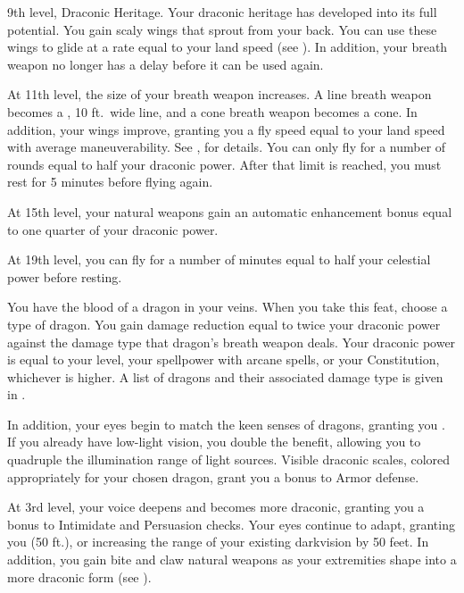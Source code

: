     \featpres 9th level, Draconic Heritage.
    \featben Your draconic heritage has developed into its full potential.
    You gain scaly wings that sprout from your back.
    You can use these wings to glide at a rate equal to your land speed (see ).
    In addition, your breath weapon no longer has a delay before it can be used again.

    At 11th level, the size of your breath weapon increases.
    A line breath weapon becomes a \areahuge, 10 ft.\ wide line, and a cone breath weapon becomes a \arealarge cone.
    In addition, your wings improve, granting you a fly speed equal to your land speed with average maneuverability.
    See , for details.
    You can only fly for a number of rounds equal to half your draconic power.
    After that limit is reached, you must rest for 5 minutes before flying again.

    At 15th level, your natural weapons gain an automatic enhancement bonus equal to one quarter of your draconic power.

    At 19th level, you can fly for a number of minutes equal to half your celestial power before resting.

    \featben You have the blood of a dragon in your veins.
    When you take this feat, choose a type of dragon.
    You gain damage reduction equal to twice your draconic power against the damage type that dragon's breath weapon deals.
    Your draconic power is equal to your level, your spellpower with arcane spells, or your Constitution, whichever is higher.
    A list of dragons and their associated damage type is given in .

    In addition, your eyes begin to match the keen senses of dragons, granting you .
    If you already have low-light vision, you double the benefit, allowing you to quadruple the illumination range of light sources.
    Visible draconic scales, colored appropriately for your chosen dragon, grant you a  bonus to Armor defense.

    At 3rd level, your voice deepens and becomes more draconic, granting you a  bonus to Intimidate and Persuasion checks.
    Your eyes continue to adapt, granting you  (50 ft.), or increasing the range of your existing darkvision by 50 feet.
    In addition, you gain bite and claw natural weapons as your extremities shape into a more draconic form (see ).

